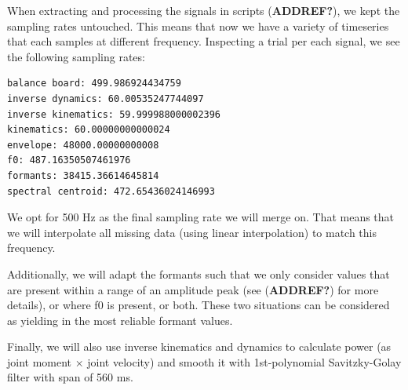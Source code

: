 \documentclass[
  letterpaper,
  DIV=11,
  numbers=noendperiod]{scrreprt}
\begin{document}
When extracting and processing the signals in scripts
(\textbf{ADDREF?}), we kept the sampling rates untouched. This means
that now we have a variety of timeseries that each samples at different
frequency. Inspecting a trial per each signal, we see the following
sampling rates:

\begin{verbatim}
balance board: 499.986924434759
inverse dynamics: 60.00535247744097
inverse kinematics: 59.999988000002396
kinematics: 60.00000000000024
envelope: 48000.00000000008
f0: 487.16350507461976
formants: 38415.36614645814
spectral centroid: 472.65436024146993
\end{verbatim}

We opt for 500 Hz as the final sampling rate we will merge on. That
means that we will interpolate all missing data (using linear
interpolation) to match this frequency.

Additionally, we will adapt the formants such that we only consider
values that are present within a range of an amplitude peak (see
(\textbf{ADDREF?}) for more details), or where f0 is present, or both.
These two situations can be considered as yielding in the most reliable
formant values.

Finally, we will also use inverse kinematics and dynamics to calculate
power (as joint moment × joint velocity) and smooth it with
1st-polynomial Savitzky-Golay filter with span of 560 ms.
\end{document}
